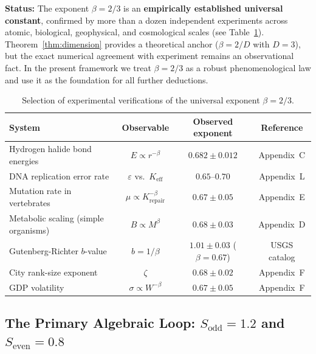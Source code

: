\documentclass[12pt,a4paper]{article}
\begin{document}
	\textbf{Status:} The exponent \(\beta = 2/3\) is an \textbf{empirically established universal constant}, confirmed by more than a dozen independent experiments across atomic, biological, geophysical, and cosmological scales (see Table~\ref{tab:beta-evidence}). Theorem~\ref{thm:dimension} provides a theoretical anchor (\(\beta = 2/D\) with \(D=3\)), but the exact numerical agreement with experiment remains an observational fact. In the present framework we treat \(\beta = 2/3\) as a robust phenomenological law and use it as the foundation for all further deductions.
	
	\begin{table}[htbp]
		\centering
		\caption{Selection of experimental verifications of the universal exponent \(\beta = 2/3\).}
		\label{tab:beta-evidence}
		\small
		\begin{tabular}{l c c c}
			\toprule
			System & Observable & Observed exponent & Reference \\
			\midrule
			Hydrogen halide bond energies & \(E \propto r^{-\beta}\) & \(0.682 \pm 0.012\) & Appendix~C \\
			DNA replication error rate & \(\varepsilon\) vs.\ \(K_{\mathrm{eff}}\) & \(0.65\text{--}0.70\) & Appendix~L \\
			Mutation rate in vertebrates & \(\mu \propto K_{\mathrm{repair}}^{-\beta}\) & \(0.67 \pm 0.05\) & Appendix~E \\
			Metabolic scaling (simple organisms) & \(B \propto M^{\beta}\) & \(0.68 \pm 0.03\) & Appendix~D \\
			Gutenberg-Richter \(b\)-value & \(b = 1/\beta\) & \(1.01 \pm 0.03\) (\(\beta=0.67\)) & USGS catalog \\
			City rank-size exponent & \(\zeta\) & \(0.68 \pm 0.02\) & Appendix~F \\
			GDP volatility & \(\sigma \propto W^{-\beta}\) & \(0.67 \pm 0.05\) & Appendix~F \\
			\bottomrule
		\end{tabular}
	\end{table}
	
	\subsection{The Primary Algebraic Loop: \(S_{\mathrm{odd}} = 1.2\) and \(S_{\mathrm{even}} = 0.8\)}
	\label{sec:algebraic-loop}
	
\end{document}
